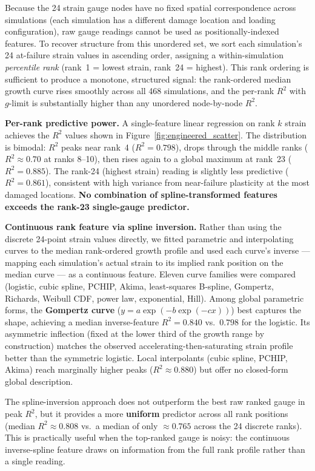 \documentclass[10pt,letterpaper]{article}
\newcommand{\Rsq}{R^2}
\begin{document}
Because the 24 strain gauge nodes have no fixed spatial correspondence across simulations
(each simulation has a different damage location and loading configuration), raw gauge
readings cannot be used as positionally-indexed features. To recover structure from this
unordered set, we sort each simulation's 24 at-failure strain values in ascending order,
assigning a within-simulation \textit{percentile rank} (rank~1 = lowest strain, rank~24 =
highest). This rank ordering is sufficient to produce a monotone, structured signal: the
rank-ordered median growth curve rises smoothly across all 468 simulations, and the per-rank
$\Rsq$ with $g$-limit is substantially higher than any unordered node-by-node $\Rsq$.

\textbf{Per-rank predictive power.} A single-feature linear regression on rank $k$ strain
achieves the $\Rsq$ values shown in Figure~\ref{fig:engineered_scatter}. The distribution is
bimodal: $\Rsq$ peaks near rank~4 ($\Rsq = 0.798$), drops through the middle ranks
($\Rsq \approx 0.70$ at ranks 8--10), then rises again to a global maximum at rank~23
($\Rsq = 0.885$). The rank-24 (highest strain) reading is slightly less predictive
($\Rsq = 0.861$), consistent with high variance from near-failure plasticity at the most
damaged locations. \textbf{No combination of spline-transformed features exceeds the rank-23
single-gauge predictor.}

\textbf{Continuous rank feature via spline inversion.} Rather than using the discrete
24-point strain values directly, we fitted parametric and interpolating curves to the median
rank-ordered growth profile and used each curve's inverse --- mapping each simulation's
actual strain to its implied rank position on the median curve --- as a continuous feature.
Eleven curve families were compared (logistic, cubic spline, PCHIP, Akima, least-squares
B-spline, Gompertz, Richards, Weibull CDF, power law, exponential, Hill). Among global
parametric forms, the \textbf{Gompertz curve} ($y = a\exp(-b\exp(-cx))$) best captures the
shape, achieving a median inverse-feature $\Rsq = 0.840$ vs.\ $0.798$ for the logistic. Its
asymmetric inflection (fixed at the lower third of the growth range by construction) matches
the observed accelerating-then-saturating strain profile better than the symmetric logistic.
Local interpolants (cubic spline, PCHIP, Akima) reach marginally higher peaks
($\Rsq \approx 0.880$) but offer no closed-form global description.

The spline-inversion approach does not outperform the best raw ranked gauge in peak $\Rsq$,
but it provides a more \textbf{uniform} predictor across all rank positions (median
$\Rsq \approx 0.808$ vs.\ a median of only $\approx 0.765$ across the 24 discrete ranks).
This is practically useful when the top-ranked gauge is noisy: the continuous inverse-spline
feature draws on information from the full rank profile rather than a single reading.
\end{document}
